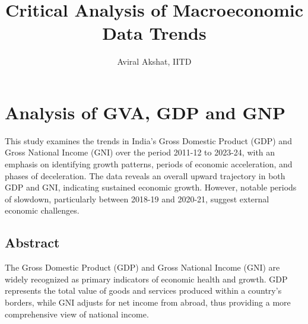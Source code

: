 \documentclass[a4paper,12pt]{extarticle} %
\begin{document}
\title{Critical Analysis of Macroeconomic Data Trends}
\author{Aviral Akshat, IITD}
\date{}


\maketitle

\tableofcontents %
\clearpage %
\section{Analysis of GVA, GDP and GNP}
\noindent This study examines the trends in India’s Gross Domestic Product (GDP) and Gross National Income (GNI) over the period 2011-12 to 2023-24, with an emphasis on identifying growth patterns, periods of economic acceleration, and phases of deceleration. The data reveals an overall upward trajectory in both GDP and GNI, indicating sustained economic growth. However, notable periods of slowdown, particularly between 2018-19 and 2020-21, suggest external economic challenges.\\





\subsection{Abstract}
The Gross Domestic Product (GDP) and Gross National Income (GNI) are widely recognized as primary indicators of economic health and growth. GDP represents the total value of goods and services produced within a country’s borders, while GNI adjusts for net income from abroad, thus providing a more comprehensive view of national income.\\ \cite{hb202312}\cite{hb202212}\cite{hb202112}\cite{hb202012}\cite{hb201912}\cite{hb201812}
\end{document}
